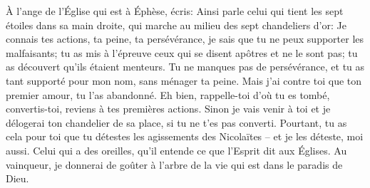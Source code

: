 À l’ange de l’Église qui est à Éphèse, écris:
	Ainsi parle celui qui tient les sept étoiles dans sa main droite,
	qui marche au milieu des sept chandeliers d’or:
	Je connais tes actions, ta peine, ta persévérance,
	je sais que tu ne peux supporter les malfaisants;
	tu as mis à l’épreuve ceux qui se disent apôtres et ne le sont pas;
	tu as découvert qu’ils étaient menteurs.
Tu ne manques pas de persévérance,
	et tu as tant supporté pour mon nom, sans ménager ta peine.
	Mais j’ai contre toi que ton premier amour, tu l’as abandonné.
Eh bien, rappelle-toi d’où tu es tombé,
	convertis-toi, reviens à tes premières actions.
Sinon je vais venir à toi
	et je délogerai ton chandelier de sa place, si tu ne t’es pas converti.
Pourtant, tu as cela pour toi que tu détestes les agissements des Nicolaïtes
	– et je les déteste, moi aussi.
Celui qui a des oreilles, qu’il entende ce que l’Esprit dit aux Églises.
Au vainqueur, je donnerai de goûter à l’arbre de la vie
	qui est dans le paradis de Dieu.
